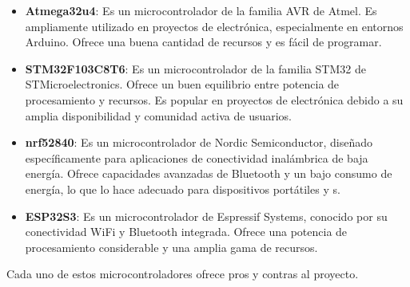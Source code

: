 \begin{itemize}
    \item \textbf{Atmega32u4}: Es un microcontrolador de la familia AVR de Atmel. Es ampliamente utilizado en proyectos de electrónica, especialmente en entornos Arduino. Ofrece una buena cantidad de recursos y es fácil de programar.
    
    \item \textbf{STM32F103C8T6}: Es un microcontrolador de la familia STM32 de STMicroelectronics. Ofrece un buen equilibrio entre potencia de procesamiento y recursos. Es popular en proyectos de electrónica debido a su amplia disponibilidad y comunidad activa de usuarios.
    
    \item \textbf{nrf52840}: Es un microcontrolador de Nordic Semiconductor, diseñado específicamente para aplicaciones de conectividad inalámbrica de baja energía. Ofrece capacidades avanzadas de \gls{Bluetooth} y un bajo consumo de energía, lo que lo hace adecuado para dispositivos portátiles y s.
    
    \item \textbf{ESP32S3}: Es un microcontrolador de Espressif Systems, conocido por su conectividad \gls{WiFi} y \gls{Bluetooth} integrada. Ofrece una potencia de procesamiento considerable y una amplia gama de recursos.
\end{itemize}
Cada uno de estos microcontroladores ofrece pros y contras al proyecto.
\newpage

